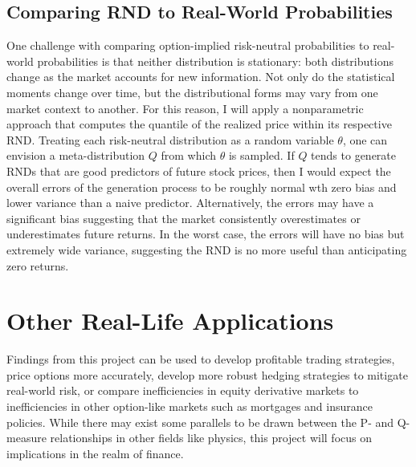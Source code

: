 \documentclass[final,3p,times,authoryear]{elsarticle}
\begin{document}
  \subsection{Comparing RND to Real-World Probabilities}
    One challenge with comparing option-implied risk-neutral probabilities to real-world probabilities is that neither distribution is stationary: both distributions change as the market accounts for new information. Not only do the statistical moments change over time, but the distributional forms may vary from one market context to another. For this reason, I will apply a nonparametric approach that computes the quantile of the realized price within its respective RND. Treating each risk-neutral distribution as a random variable $\theta$, one can envision a meta-distribution $Q$ from which $\theta$ is sampled. If $Q$ tends to generate RNDs that are good predictors of future stock prices, then I would expect the overall errors of the generation process to be roughly normal wth zero bias and lower variance than a naive predictor. Alternatively, the errors may have a significant bias suggesting that the market consistently overestimates or underestimates future returns. In the worst case, the errors will have no bias but extremely wide variance, suggesting the RND is no more useful than anticipating zero returns.

\section{Other Real-Life Applications}
  \label{applications}
  Findings from this project can be used to develop profitable trading strategies, price options more accurately, develop more robust hedging strategies to mitigate real-world risk, or compare inefficiencies in equity derivative markets to inefficiencies in other option-like markets such as mortgages and insurance policies. While there may exist some parallels to be drawn between the P- and Q-measure relationships in other fields like physics, this project will focus on implications in the realm of finance.


 

\end{document}

